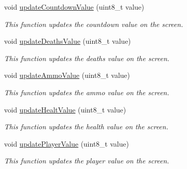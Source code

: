 \begin{DoxyCompactItemize}
void \mbox{\hyperlink{class_display_control_a7a566545dbdd6834307d27de99a221d6}{update\+Countdown\+Value}} (uint8\+\_\+t value)
\begin{DoxyCompactList}\small\item\em This function updates the countdown value on the screen. \end{DoxyCompactList}\item 
\mbox{\label{class_display_control_a6bb416767f43144827fa5bf6ecece4a9}} 
void \mbox{\hyperlink{class_display_control_a6bb416767f43144827fa5bf6ecece4a9}{update\+Deaths\+Value}} (uint8\+\_\+t value)
\begin{DoxyCompactList}\small\item\em This function updates the deaths value on the screen. \end{DoxyCompactList}\item 
\mbox{\label{class_display_control_aa54c7b984287e6a694ea83a3cb3d8ece}} 
void \mbox{\hyperlink{class_display_control_aa54c7b984287e6a694ea83a3cb3d8ece}{update\+Ammo\+Value}} (uint8\+\_\+t value)
\begin{DoxyCompactList}\small\item\em This function updates the ammo value on the screen. \end{DoxyCompactList}\item 
\mbox{\label{class_display_control_a1d61b517063ca3f3dd36d2b7eb3ef909}} 
void \mbox{\hyperlink{class_display_control_a1d61b517063ca3f3dd36d2b7eb3ef909}{update\+Healt\+Value}} (uint8\+\_\+t value)
\begin{DoxyCompactList}\small\item\em This function updates the health value on the screen. \end{DoxyCompactList}\item 
\mbox{\label{class_display_control_ad6107e04362c907da6a64b73bcc9e795}} 
void \mbox{\hyperlink{class_display_control_ad6107e04362c907da6a64b73bcc9e795}{update\+Player\+Value}} (uint8\+\_\+t value)
\begin{DoxyCompactList}\small\item\em This function updates the player value on the screen. \end{DoxyCompactList}\item 
\mbox{\label{class_display_control_ae343066ad92148ddc6cd9f253993d4b4}} 

\end{DoxyCompactItemize}
